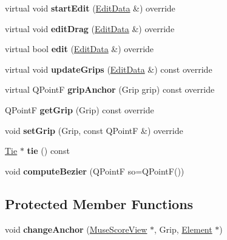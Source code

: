\begin{DoxyCompactItemize}
\item 
\mbox{\label{class_ms_1_1_tie_segment_aae621914b133708b881c7cf5bb2915a1}} 
virtual void {\bfseries start\+Edit} (\hyperlink{class_ms_1_1_edit_data}{Edit\+Data} \&) override
\item 
\mbox{\label{class_ms_1_1_tie_segment_a80478698bd6ddbac33a82693819e3888}} 
virtual void {\bfseries edit\+Drag} (\hyperlink{class_ms_1_1_edit_data}{Edit\+Data} \&) override
\item 
\mbox{\label{class_ms_1_1_tie_segment_ac1800d3f6de0deb71a46dfd2d45b4ed3}} 
virtual bool {\bfseries edit} (\hyperlink{class_ms_1_1_edit_data}{Edit\+Data} \&) override
\item 
\mbox{\label{class_ms_1_1_tie_segment_a9fa016e27f9074d663bedaaf66d23a82}} 
virtual void {\bfseries update\+Grips} (\hyperlink{class_ms_1_1_edit_data}{Edit\+Data} \&) const override
\item 
\mbox{\label{class_ms_1_1_tie_segment_a77fbf8ce2b175d81e4af21d72769c5ef}} 
virtual Q\+PointF {\bfseries grip\+Anchor} (Grip grip) const override
\item 
\mbox{\label{class_ms_1_1_tie_segment_a72f6be6480a0017c76075df8dcdc1efa}} 
Q\+PointF {\bfseries get\+Grip} (Grip) const override
\item 
\mbox{\label{class_ms_1_1_tie_segment_afa6c24e70fe9d30147ae460c8745ad4f}} 
void {\bfseries set\+Grip} (Grip, const Q\+PointF \&) override
\item 
\mbox{\label{class_ms_1_1_tie_segment_a170874fb8348f4372c0a819734a458c3}} 
\hyperlink{class_ms_1_1_tie}{Tie} $\ast$ {\bfseries tie} () const
\item 
\mbox{\label{class_ms_1_1_tie_segment_a6c3f6f0bd252a82090a1e3c967680d3f}} 
void {\bfseries compute\+Bezier} (Q\+PointF so=Q\+PointF())
\end{DoxyCompactItemize}
\subsection*{Protected Member Functions}
\begin{DoxyCompactItemize}
\item 
\mbox{\label{class_ms_1_1_tie_segment_afa01d044abe596919585c0101c0ce605}} 
void {\bfseries change\+Anchor} (\hyperlink{class_ms_1_1_muse_score_view}{Muse\+Score\+View} $\ast$, Grip, \hyperlink{class_ms_1_1_element}{Element} $\ast$)
\end{DoxyCompactItemize}
